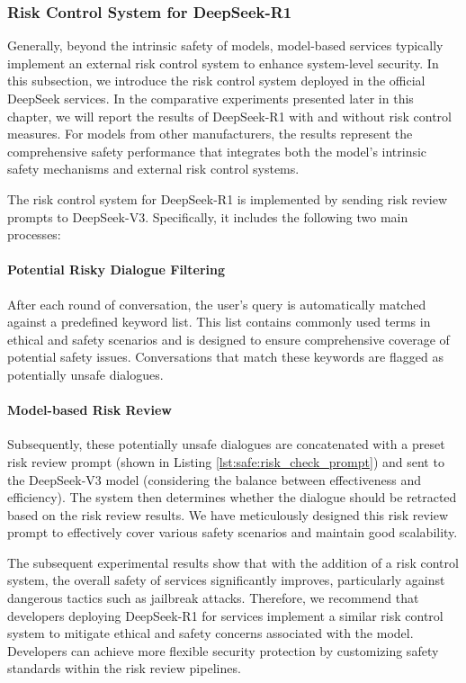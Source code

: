 \subsubsection{Risk Control System for DeepSeek-R1}
\label{sec:risk_control}
Generally, beyond the intrinsic safety of models, model-based services typically implement an external risk control system to enhance system-level security. In this subsection, we introduce the risk control system deployed in the official DeepSeek services. In the comparative experiments presented later in this chapter, we will report the results of DeepSeek-R1 with and without risk control measures. For models from other manufacturers, the results represent the comprehensive safety performance that integrates both the model's intrinsic safety mechanisms and external risk control systems.



The risk control system for DeepSeek-R1 is implemented by sending risk review prompts to DeepSeek-V3. Specifically, it includes the following two main processes:

\paragraph{Potential Risky Dialogue Filtering}
After each round of conversation, the user's query is automatically matched against a predefined keyword list. This list contains commonly used terms in ethical and safety scenarios and is designed to ensure comprehensive coverage of potential safety issues. Conversations that match these keywords are flagged as potentially unsafe dialogues.

\paragraph{Model-based Risk Review}
Subsequently, these potentially unsafe dialogues are concatenated with a preset risk review prompt (shown in Listing \ref{lst:safe:risk_check_prompt}) and sent to the DeepSeek-V3 model (considering the balance between effectiveness and efficiency). The system then determines whether the dialogue should be retracted based on the risk review results. We have meticulously designed this risk review prompt to effectively cover various safety scenarios and maintain good scalability.

The subsequent experimental results show that with the addition of a risk control system, the overall safety of services significantly improves, particularly against dangerous tactics such as jailbreak attacks. Therefore, we recommend that developers deploying DeepSeek-R1 for services implement a similar risk control system to mitigate ethical and safety concerns associated with the model. Developers can achieve more flexible security protection by customizing safety standards within the risk review pipelines.



